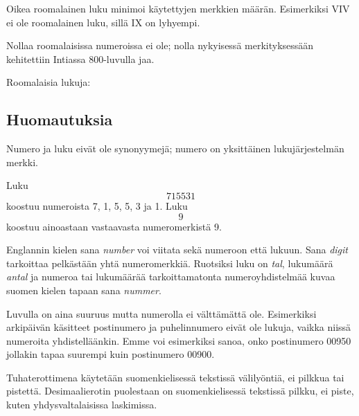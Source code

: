Oikea roomalainen luku minimoi käytettyjen merkkien määrän. Esimerkiksi VIV ei ole roomalainen luku, sillä IX on lyhyempi.

Nollaa roomalaisissa numeroissa ei ole; nolla nykyisessä merkityksessään kehitettiin Intiassa 800-luvulla jaa.

\begin{esimerkki}
	Roomalaisia lukuja:
	\begin{alakohdat}
	\end{alakohdat}
\end{esimerkki}

\subsection*{Huomautuksia}

Numero ja luku eivät ole synonyymejä; numero on yksittäinen lukujärjestelmän merkki.

\begin{esimerkki}
	Luku \[715531\] koostuu numeroista 7, 1, 5, 5, 3 ja 1.
	Luku \[9\] koostuu ainoastaan vastaavasta numeromerkistä 9.
\end{esimerkki}

Englannin kielen sana \textit{number} voi viitata sekä numeroon että lukuun.
Sana \textit{digit} tarkoittaa pelkästään yhtä numeromerkkiä.
Ruotsiksi luku on \textit{tal}, lukumäärä \textit{antal} ja numeroa tai lukumäärää tarkoittamatonta numeroyhdistelmää kuvaa suomen kielen tapaan sana \textit{nummer}.

Luvulla on aina suuruus mutta numerolla ei välttämättä ole. Esimerkiksi arkipäivän käsitteet postinumero ja puhelinnumero eivät ole lukuja, vaikka niissä numeroita yhdistelläänkin. 
Emme voi esimerkiksi sanoa, onko postinumero 00950 jollakin tapaa suurempi kuin postinumero 00900.

Tuhaterottimena käytetään suomenkielisessä tekstissä välilyöntiä, ei pilkkua tai pistettä.
Desimaalierotin puolestaan on suomenkielisessä tekstissä pilkku, ei piste, kuten yhdysvaltalaisissa laskimissa.
